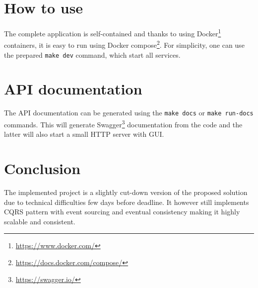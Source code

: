 \documentclass[11pt,a4paper]{article}
\begin{document}
\section{How to use}
	The complete application is self-contained and thanks to using Docker\footnote{\url{https://www.docker.com/}} containers, it is easy to run using Docker compose\footnote{\url{https://docs.docker.com/compose/}}. For simplicity, one can use the prepared \texttt{make dev} command, which start all services.
	
	

\section{API documentation}\label{sec:api-documentation}
	The API documentation can be generated using the \texttt{make docs} or \texttt{make run-docs} commands. This will generate Swagger\footnote{\url{https://swagger.io/}} documentation from the code and the latter will also start a small HTTP server with GUI.

\section{Conclusion}
	The implemented project is a slightly cut-down version of the proposed solution due to technical difficulties few days before deadline. It however still implements CQRS pattern with event sourcing and eventual consistency making it highly scalable and consistent.

	
%
\end{document}
